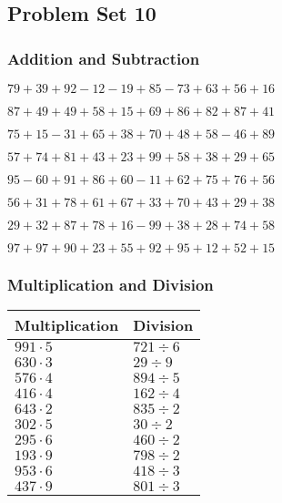 \hypertarget{problem-set-10}{%
\subsection{Problem Set 10}\label{problem-set-10}}

\hypertarget{addition-and-subtraction}{%
\subsubsection{Addition and
Subtraction}\label{addition-and-subtraction}}

\(79+39+92-12-19+85-73+63+56+16\)

\(87+49+49+58+15+69+86+82+87+41\)

\(75+15-31+65+38+70+48+58-46+89\)

\(57+74+81+43+23+99+58+38+29+65\)

\(95-60+91+86+60-11+62+75+76+56\)

\(56+31+78+61+67+33+70+43+29+38\)

\(29+32+87+78+16-99+38+28+74+58\)

\(97+97+90+23+55+92+95+12+52+15\)

\hypertarget{multiplication-and-division}{%
\subsubsection{Multiplication and
Division}\label{multiplication-and-division}}

\begin{longtable}[]{@{}ll@{}}
\toprule
Multiplication & Division\tabularnewline
\midrule
\endhead
\(991\cdot5\) & \(721÷6\)\tabularnewline
\(630\cdot3\) & \(29÷9\)\tabularnewline
\(576\cdot4\) & \(894÷5\)\tabularnewline
\(416\cdot4\) & \(162÷4\)\tabularnewline
\(643\cdot2\) & \(835÷2\)\tabularnewline
\(302\cdot5\) & \(30÷2\)\tabularnewline
\(295\cdot6\) & \(460÷2\)\tabularnewline
\(193\cdot9\) & \(798÷2\)\tabularnewline
\(953\cdot6\) & \(418÷3\)\tabularnewline
\(437\cdot9\) & \(801÷3\)\tabularnewline
\bottomrule
\end{longtable}
